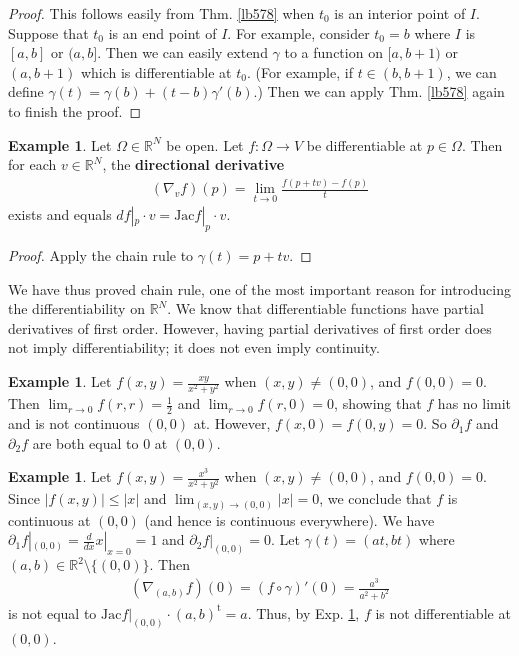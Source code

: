 \documentclass[12pt,b5paper,notitlepage]{article}
\theoremstyle{definition}
\newtheorem{eg}[df]{Example}
\theoremstyle{plain}
\newcommand{\tr}{\mathrm{t}} %
\newcommand{\Rbb}{\mathbb R}
\newcommand{\Jac}{\mathrm{Jac}}
\newcommand{\dps}{\displaystyle}
\numberwithin{equation}{section}
\begin{document}
\begin{proof}
This follows easily from Thm. \ref{lb578} when $t_0$ is an interior point of $I$. Suppose that $t_0$ is an end point of $I$. For example, consider $t_0=b$ where $I$ is $[a,b]$ or $(a,b]$. Then we can easily extend $\gamma$ to a function on $[a,b+1)$ or $(a,b+1)$ which is differentiable at $t_0$. (For example, if $t\in(b,b+1)$, we can define $\gamma(t)=\gamma(b)+(t-b)\gamma'(b)$.) Then we can apply Thm. \ref{lb578} again to finish the proof.
\end{proof}



\begin{eg}\label{lb579}
Let $\Omega\in\Rbb^N$ be open. Let $f:\Omega\rightarrow V$ be differentiable at $p\in\Omega$. Then for each $v\in\Rbb^N$, the \textbf{directional derivative} 
\begin{align*}
(\nabla_vf)(p)=\lim_{t\rightarrow 0}\frac{f(p+tv)-f(p)}{t}
\end{align*}
exists and equals $df|_p\cdot v=\Jac f|_p\cdot v$.
\end{eg}

\begin{proof}
Apply the chain rule to $\gamma(t)=p+tv$.
\end{proof}


We have thus proved chain rule, one of the most important reason for introducing the differentiability on $\Rbb^N$. We know that differentiable functions have partial derivatives of first order. However, having partial derivatives of first order does not imply differentiability; it does not even imply continuity.


\begin{eg}
Let $\dps f(x,y)=\frac{xy}{x^2+y^2}$ when $(x,y)\neq (0,0)$, and $f(0,0)=0$. Then $\lim_{r\rightarrow 0}f(r,r)=\frac 12$ and $\lim_{r\rightarrow 0}f(r,0)=0$, showing that $f$ has no limit and is not continuous $(0,0)$ at. However, $f(x,0)=f(0,y)=0$. So $\partial_1f$ and $\partial_2f$ are both equal to $0$ at $(0,0)$.
\end{eg}

\begin{eg}
Let $\dps f(x,y)=\frac{x^3}{x^2+y^2}$ when $(x,y)\neq (0,0)$, and $f(0,0)=0$. Since $|f(x,y)|\leq |x|$ and $\lim_{(x,y)\rightarrow(0,0)}|x|=0$, we conclude that $f$ is continuous at $(0,0)$ (and hence is continuous everywhere). We have $\partial_1 f|_{(0,0)}=\frac d{dx}x|_{x=0}=1$ and $\partial_2 f|_{(0,0)}=0$. Let $\gamma(t)=(at,bt)$ where $(a,b)\in\Rbb^2\setminus\{(0,0)\}$. Then
\begin{align*}
(\nabla_{(a,b)} f)(0)=(f\circ\gamma)'(0)=\frac{a^3}{a^2+b^2}
\end{align*}
is not equal to $\Jac f|_{(0,0)}\cdot (a,b)^\tr=a$. Thus, by Exp. \ref{lb579}, $f$ is not differentiable at $(0,0)$.
\end{eg}
\end{document}
